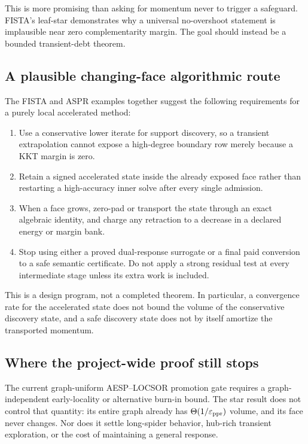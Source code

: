 This is more promising than asking for momentum never to trigger a safeguard.
FISTA's leaf-star demonstrates why a universal no-overshoot statement is
implausible near zero complementarity margin.  The goal should instead be a
bounded transient-debt theorem.

\subsection{A plausible changing-face algorithmic route}

The FISTA and ASPR examples together suggest the following requirements for a
purely local accelerated method:

\begin{enumerate}[leftmargin=*]
\item Use a conservative lower iterate for support discovery, so a transient
      extrapolation cannot expose a high-degree boundary row merely because a
      KKT margin is zero.
\item Retain a signed accelerated state inside the already exposed face rather
      than restarting a high-accuracy inner solve after every single
      admission.
\item When a face grows, zero-pad or transport the state through an exact
      algebraic identity, and charge any retraction to a decrease in a
      declared energy or margin bank.
\item Stop using either a proved dual-response surrogate or a final paid
      conversion to a safe semantic certificate.  Do not apply a strong
      residual test at every intermediate stage unless its extra work is
      included.
\end{enumerate}

This is a design program, not a completed theorem.  In particular, a
convergence rate for the accelerated state does not bound the volume of the
conservative discovery state, and a safe discovery state does not by itself
amortize the transported momentum.

\subsection{Where the project-wide proof still stops}

The current graph-uniform AESP--LOCSOR promotion gate requires a
graph-independent early-locality or alternative burn-in bound.  The star
result does not control that quantity: its entire graph already has
$\Theta(1/\varepsilon_{\rm ppr})$ volume, and its face never changes.  Nor
does it settle long-spider behavior, hub-rich transient exploration, or the
cost of maintaining a general response.


